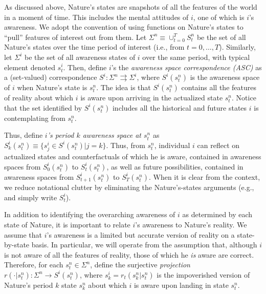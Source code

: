 \documentclass[
11pt,
titlepage,
reqno,
]{article}%
\theoremstyle{definition}
\begin{document}
As discussed above, Nature's states are snapshots of all the features of the world in a moment of time.
This includes the mental attitudes of $i$, one of which is $i$'s awareness.
We adopt the convention of using functions on Nature's states to ``pull'' features of interest out from them. 
Let $\Sigma^n\equiv \cup_{t=0}^T S^n_t$ be the set of all Nature's states over the time period of interest (i.e., from $t=0,\ldots,T$).
Similarly, let $\Sigma^i$ be the set of all awareness states of $i$ over the same period, with typical element denoted $s^i_t$.
Then, define $i$'s the \textit{awareness space correspondence (ASC)} as a (set-valued) correspondence $S^i:\Sigma^n\rightrightarrows \Sigma^i$, where $S^i(s^n_t)$ is the awareness space of $i$ when Nature's state is $s^n_t$. 
The idea is that  $S^i(s^n_t)$ contains all the features of reality about which $i$ is aware upon arriving in the actualized state $s^n_t$. 
Notice that the set identified by $S^i(s^n_t)$ includes all the historical and future states $i$ is contemplating from $s^n_t$.


Thus, define \textit{$i$'s period $k$ awareness space at $s^n_t$} as  $S^i_k(s^n_t)\equiv\{s^i_j\in S^i(s^n_t)|j=k\}$.
Thus, from $s^n_t$, individual $i$ can reflect on actualized states and counterfactuals of which he is aware, contained in awareness spaces from $S^i_0(s^n_t)$ to $S^i_t(s^n_t)$, as well as future possibilities, contained in awareness spaces from $S^i_{t+1}(s^n_t)$ to $S^i_T(s^n_t)$.
When it is clear from the context, we reduce notational clutter by eliminating the Nature's-states arguments (e.g., and simply write $S^i_t$).

In addition to identifying the overarching awareness of $i$ as determined by each state of Nature, it is important to relate $i$'s awareness to Nature's reality. 
We assume that $i$'s awareness is a limited but accurate version of reality on a state-by-state basis.
In particular, we will operate from the assumption that, although $i$ is not aware of all the features of reality,  those of which he \textit{is} aware are correct.  
Therefore, for each $s^n_t\in \Sigma^n$, define the surjective \textit{projection} $r(\cdot|s^n_t):\Sigma^n\rightarrow S^i(s^n_t)$, where $s^i_k=r_t(s^n_k|s^n_t)$ is the impoverished version of Nature's period $k$ state $s^n_k$ about which $i$ is aware upon landing in state $s^n_t$.
\end{document}
